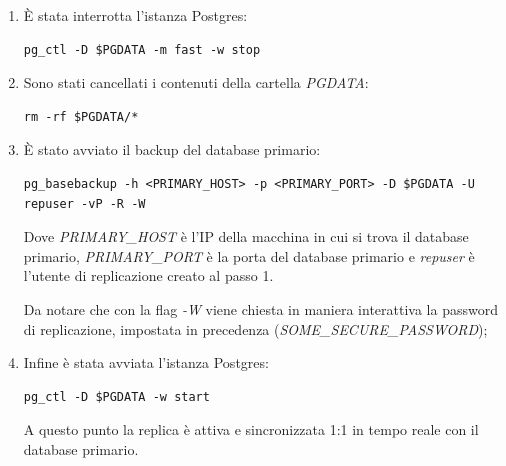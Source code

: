 \begin{enumerate}
  \item È stata interrotta l'istanza Postgres:
  \vspace{1mm}
\begin{lstlisting}[]
pg_ctl -D $PGDATA -m fast -w stop
\end{lstlisting}
  \item Sono stati cancellati i contenuti della cartella \textit{PGDATA}:
  \vspace{1mm}
\begin{lstlisting}[]
rm -rf $PGDATA/*
\end{lstlisting}
  \item È stato avviato il backup del database primario:
  \vspace{1mm}
\begin{lstlisting}[]
pg_basebackup -h <PRIMARY_HOST> -p <PRIMARY_PORT> -D $PGDATA -U repuser -vP -R -W
\end{lstlisting}
Dove \textit{PRIMARY\_HOST} è l'IP della macchina in cui si trova il database primario, \textit{PRIMARY\_PORT} è la porta del database primario e \textit{repuser} è l'utente di replicazione creato al passo 1.

Da notare che con la flag \textit{-W} viene chiesta in maniera interattiva la password di replicazione, impostata in precedenza (\textit{SOME\_SECURE\_PASSWORD});
  \item Infine è stata avviata l'istanza Postgres:
  \vspace{1mm}
\begin{lstlisting}[]
pg_ctl -D $PGDATA -w start
\end{lstlisting}
A questo punto la replica è attiva e sincronizzata 1:1 in tempo reale con il database primario.
\end{enumerate}

